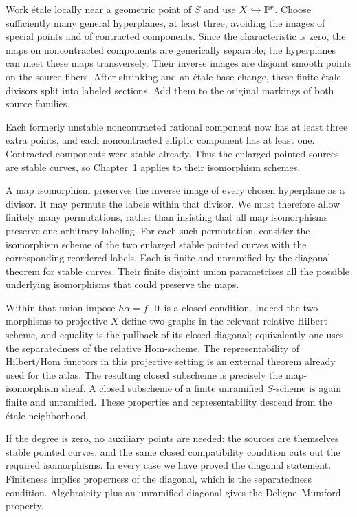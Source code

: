 Work \'etale locally near a geometric point of $S$ and use $X\hookrightarrow\mathbb P^r$. Choose sufficiently many general hyperplanes, at least three, avoiding the images of special points and of contracted components. Since the characteristic is zero, the maps on noncontracted components are generically separable; the hyperplanes can meet these maps transversely. Their inverse images are disjoint smooth points on the source fibers. After shrinking and an \'etale base change, these finite \'etale divisors split into labeled sections. Add them to the original markings of both source families.

Each formerly unstable noncontracted rational component now has at least three extra points, and each noncontracted elliptic component has at least one. Contracted components were stable already. Thus the enlarged pointed sources are stable curves, so Chapter~1 applies to their isomorphism schemes.

A map isomorphism preserves the inverse image of every chosen hyperplane as a divisor. It may permute the labels within that divisor. We must therefore allow finitely many permutations, rather than insisting that all map isomorphisms preserve one arbitrary labeling. For each such permutation, consider the isomorphism scheme of the two enlarged stable pointed curves with the corresponding reordered labels. Each is finite and unramified by the diagonal theorem for stable curves. Their finite disjoint union parametrizes all the possible underlying isomorphisms that could preserve the maps.

Within that union impose $h\alpha=f$. It is a closed condition. Indeed the two morphisms to projective $X$ define two graphs in the relevant relative Hilbert scheme, and equality is the pullback of its closed diagonal; equivalently one uses the separatedness of the relative Hom-scheme. The representability of Hilbert/Hom functors in this projective setting is an external theorem already used for the atlas. The resulting closed subscheme is precisely the map-isomorphism sheaf. A closed subscheme of a finite unramified $S$-scheme is again finite and unramified. These properties and representability descend from the \'etale neighborhood.

If the degree is zero, no auxiliary points are needed: the sources are themselves stable pointed curves, and the same closed compatibility condition cuts out the required isomorphisms. In every case we have proved the diagonal statement. Finiteness implies properness of the diagonal, which is the separatedness condition. Algebraicity plus an unramified diagonal gives the Deligne--Mumford property.

